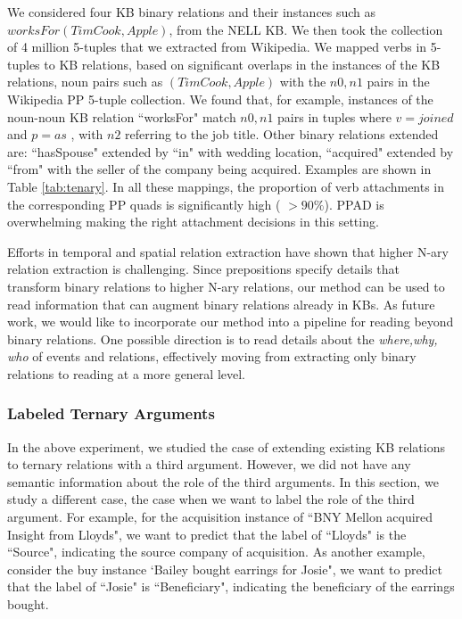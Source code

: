 We considered four KB binary relations and their instances such as $worksFor(Tim Cook, Apple)$, from the NELL KB. We then took the collection of 4 million 5-tuples  that we extracted from Wikipedia. We mapped verbs in 5-tuples to KB relations, based on  significant overlaps in the instances of the KB relations, noun pairs such as $(Tim Cook, Apple)$ with the  $n0,n1$ pairs in the Wikipedia PP 5-tuple collection. We found that, for example,  instances of the noun-noun KB relation ``worksFor" match $n0,n1$ pairs in tuples where  $v= joined$ and  $p=as$ , with  $n2$ referring  to the job title.  Other binary relations extended are: ``hasSpouse" extended by ``in" with wedding location, ``acquired" extended by ``from" with the  seller of the company being acquired.  Examples are  shown in Table \ref{tab:tenary}. 
In all these mappings, the proportion of verb attachments in the corresponding PP quads is significantly  high ( $ > 90\%$). PPAD is overwhelming  making the right attachment decisions in this setting.

Efforts in temporal and spatial relation extraction have shown that higher N-ary relation extraction is challenging.  Since prepositions specify details that transform binary relations to higher N-ary relations, our method can be used to read information that can augment  binary relations already in KBs. As future work, we would like to incorporate our method into a pipeline for reading beyond binary relations. One possible direction is to read details about the \textit{where,why, who} of events and relations, effectively moving from extracting only binary relations to reading at a more general level.


\subsubsection{Labeled Ternary Arguments}
In the above experiment, we studied the case of extending existing KB relations to ternary relations
with a third argument. However, we did not have any semantic information about the role of the third arguments. In this section, we study a different case, the case when we want to label the role of the third argument. For example, for the acquisition instance of ``BNY Mellon acquired Insight from Lloyds",  we want to predict that the label of ``Lloyds" is the ``Source",  indicating the source company of acquisition.  As another example, consider the buy instance `Bailey	bought	earrings	for	Josie",  we want to predict that the label of ``Josie" is ``Beneficiary", indicating the beneficiary of the earrings bought. 


